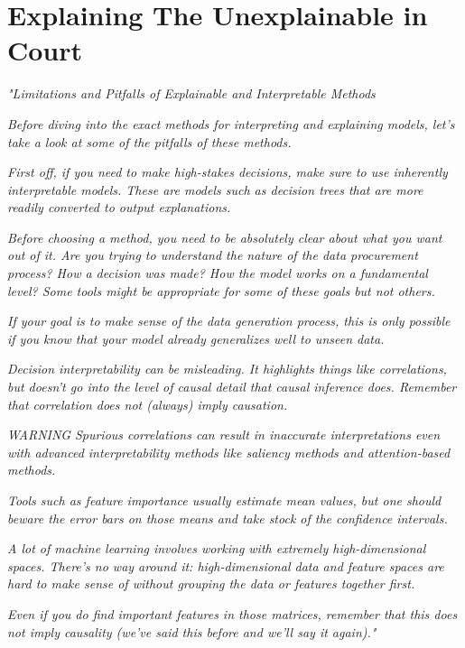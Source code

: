 \section{Explaining The Unexplainable in Court}

\textit{"Limitations and Pitfalls of Explainable and Interpretable Methods}

\textit{Before diving into the exact methods for interpreting and explaining models, let's take a look at some of the pitfalls of these methods.}

\textit{First off, if you need to make high-stakes decisions, make sure to use inherently interpretable models. These are models such as decision trees that are more readily converted to output explanations.}

\textit{Before choosing a method, you need to be absolutely clear about what you want out of it. Are you trying to understand the nature of the data procurement process? How a decision was made? How the model works on a fundamental level? Some tools might be appropriate for some of these goals but not others.}

\textit{If your goal is to make sense of the data generation process, this is only possible if you know that your model already generalizes well to unseen data.}

\textit{Decision interpretability can be misleading. It highlights things like correlations, but doesn’t go into the level of causal detail that causal inference does. Remember that correlation does not (always) imply causation.}

\textit{WARNING}
\textit{Spurious correlations can result in inaccurate interpretations even with advanced interpretability methods like saliency methods and attention-based methods.}

\textit{Tools such as feature importance usually estimate mean values, but one should beware the error bars on those means and take stock of the confidence intervals.}

\textit{A lot of machine learning involves working with extremely high-dimensional spaces. There's no way around it: high-dimensional data and feature spaces are hard to make sense of without grouping the data or features together first.}

\textit{Even if you do find important features in those matrices, remember that this does not imply causality (we've said this before and we'll say it again)."} \cite{trustworthyml}

